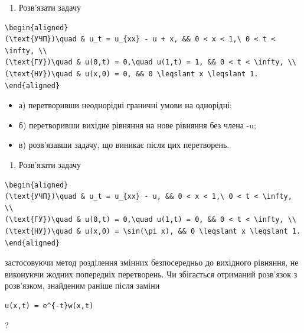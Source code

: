 \documentclass[
  ukrainian,
]{article}
\providecommand{\tightlist}{%
  \setlength{\itemsep}{0pt}\setlength{\parskip}{0pt}}
\begin{document}
\begin{enumerate}
\def\labelenumi{\arabic{enumi}.}
\setcounter{enumi}{1}
\tightlist
\item
  Розв'язати задачу
\end{enumerate}

\begin{verbatim}
\begin{aligned}
(\text{УЧП})\quad & u_t = u_{xx} - u + x, && 0 < x < 1,\ 0 < t < \infty, \\
(\text{ГУ})\quad & u(0,t) = 0,\quad u(1,t) = 1, && 0 < t < \infty, \\
(\text{НУ})\quad & u(x,0) = 0, && 0 \leqslant x \leqslant 1.
\end{aligned}
\end{verbatim}

\begin{itemize}
\item
  а) перетворивши неоднорідні граничні умови на однорідні;
\item
  б) перетворивши вихідне рівняння на нове рівняння без члена -u;
\item
  в) розв'язавши задачу, що виникає після цих перетворень.
\end{itemize}

\begin{enumerate}
\def\labelenumi{\arabic{enumi}.}
\setcounter{enumi}{2}
\tightlist
\item
  Розв'язати задачу
\end{enumerate}

\begin{verbatim}
\begin{aligned}
(\text{УЧП})\quad & u_t = u_{xx} - u, && 0 < x < 1,\ 0 < t < \infty, \\
(\text{ГУ})\quad & u(0,t) = 0,\quad u(1,t) = 0, && 0 < t < \infty, \\
(\text{НУ})\quad & u(x,0) = \sin(\pi x), && 0 \leqslant x \leqslant 1.
\end{aligned}
\end{verbatim}

застосовуючи метод розділення змінних безпосередньо до вихідного
рівняння, не виконуючи жодних попередніх перетворень. Чи збігається
отриманий розв'язок з розв'язком, знайденим раніше після заміни

\begin{verbatim}
u(x,t) = e^{-t}w(x,t)
\end{verbatim}

?
\end{document}
